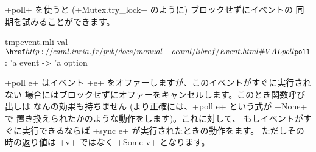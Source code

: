 \ml+poll+ を使うと (\ml+Mutex.try_lock+ のように) ブロックせずにイベントの
同期を試みることができます。
%
\begin{listingcodefile}{tmpevent.mli}
val $\indexlibvalue{Event}{poll}$ : 'a event -> 'a option
\end{listingcodefile}
%
\ml+poll e+ はイベント \ml+e+ をオファーしますが、このイベントがすぐに実行されない
場合にはブロックせずにオファーをキャンセルします。このとき関数呼び出しは
なんの効果も持ちません (より正確には、\ml+poll e+ という式が \ml+None+ で
置き換えられたかのような動作をします)。これに対して、
もしイベントがすぐに実行できるならば \ml+sync e+ が実行されたときの動作をます。
ただしその時の返り値は \ml+v+ ではなく \ml+Some v+ となります。

